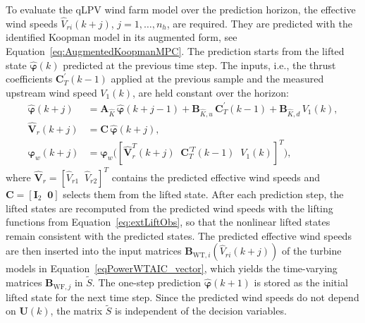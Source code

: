 To evaluate the qLPV wind farm model over the prediction horizon, the effective wind speeds $\hat{V}_{ri}(k+j)$, $j = 1, \dots, n_h$, are required. They are predicted with the identified Koopman model in its augmented form, see Equation~\eqref{eq:AugmentedKoopmanMPC}. The prediction starts from the lifted state $\hat{\bm{\varphi}}(k)$ predicted at the previous time step. The inputs, i.e., the thrust coefficients $\bm{C}_T^\prime(k-1)$ applied at the previous sample and the measured upstream wind speed $V_1(k)$, are held constant over the horizon:
\begin{align*}
    \hat{\bm{\varphi}}(k+j) &= \bm{A}_{\hat{K}}\,  \hat{\bm{\varphi}}(k+j-1) + \bm{B}_{\hat{K},u}\, \bm{C}_T^\prime(k-1) + \bm{B}_{\hat{K},d}\, V_1(k), \\
    \hat{\bm{V}}_r(k+j) &= \bm{C}\, \hat{\bm{\varphi}}(k+j), \\
    \bm{\varphi}_w(k+j) &= \bm{\varphi}_w\big([\hat{\bm{V}}_r^T(k+j) \;\; \bm{C}_T^{\prime T}(k-1) \;\; V_1(k)]^T\big),
\end{align*}
where $\hat{\bm{V}}_r = [\hat{V}_{r1} \;\; \hat{V}_{r2}]^T$ contains the predicted effective wind speeds and $\bm{C} = [\bm{I}_{2} \;\; \bm{0}]$ selects them from the lifted state. After each prediction step, the lifted states are recomputed from the predicted wind speeds with the lifting functions from Equation~\eqref{eq:extLiftObs}, so that the nonlinear lifted states remain consistent with the predicted states. The predicted effective wind speeds are then inserted into the input matrices $\bm{B}_{\text{WT},i}(\hat{V}_{ri}(k+j))$ of the turbine models in Equation~\eqref{eqPowerWTAIC_vector}, which yields the time-varying matrices $\bm{B}_{\text{WF},j}$ in $\tilde{S}$. The one-step prediction $\hat{\bm{\varphi}}(k+1)$ is stored as the initial lifted state for the next time step. Since the predicted wind speeds do not depend on $\bm{U}(k)$, the matrix $\tilde{S}$ is independent of the decision variables.

